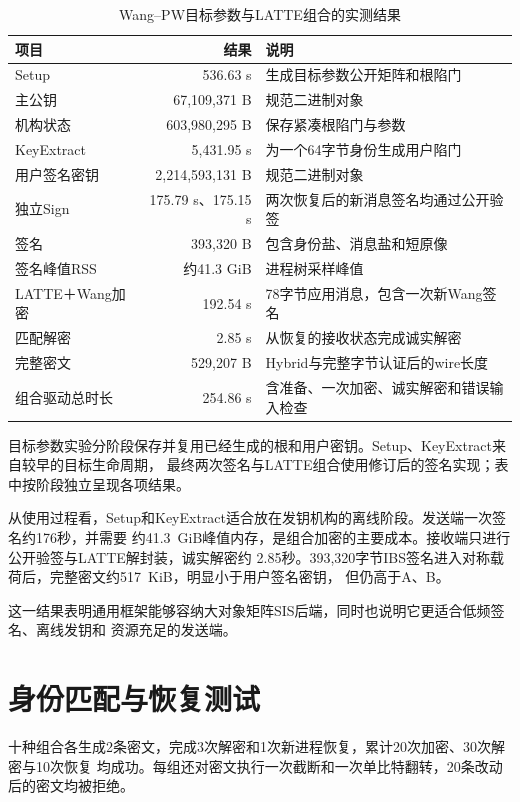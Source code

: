 \begin{table}[H]
\centering\small
\caption{Wang--PW目标参数与LATTE组合的实测结果}
\label{tab:wang-results}
\begin{tabularx}{\textwidth}{@{}p{}rX@{}}
\toprule
\rowcolor{black!8} 项目 & 结果 & 说明 \\
\midrule
Setup & 536.63 s & 生成目标参数公开矩阵和根陷门 \\
主公钥 & 67,109,371 B & 规范二进制对象 \\
机构状态 & 603,980,295 B & 保存紧凑根陷门与参数 \\
KeyExtract & 5,431.95 s & 为一个64字节身份生成用户陷门 \\
用户签名密钥 & 2,214,593,131 B & 规范二进制对象 \\
独立Sign & 175.79 s、175.15 s & 两次恢复后的新消息签名均通过公开验签 \\
签名 & 393,320 B & 包含身份盐、消息盐和短原像 \\
签名峰值RSS & 约41.3 GiB & 进程树采样峰值 \\
LATTE＋Wang加密 & 192.54 s & 78字节应用消息，包含一次新Wang签名 \\
匹配解密 & 2.85 s & 从恢复的接收状态完成诚实解密 \\
完整密文 & 529,207 B & Hybrid与完整字节认证后的wire长度 \\
组合驱动总时长 & 254.86 s & 含准备、一次加密、诚实解密和错误输入检查 \\
\bottomrule
\end{tabularx}
\end{table}

目标参数实验分阶段保存并复用已经生成的根和用户密钥。Setup、KeyExtract来自较早的目标生命周期，
最终两次签名与LATTE组合使用修订后的签名实现；表中按阶段独立呈现各项结果。

从使用过程看，Setup和KeyExtract适合放在发钥机构的离线阶段。发送端一次签名约176秒，并需要
约41.3~GiB峰值内存，是组合加密的主要成本。接收端只进行公开验签与LATTE解封装，诚实解密约
2.85秒。393,320字节IBS签名进入对称载荷后，完整密文约517~KiB，明显小于用户签名密钥，
但仍高于A、B。

这一结果表明通用框架能够容纳大对象矩阵SIS后端，同时也说明它更适合低频签名、离线发钥和
资源充足的发送端。

\section{身份匹配与恢复测试}
十种组合各生成2条密文，完成3次解密和1次新进程恢复，累计20次加密、30次解密与10次恢复
均成功。每组还对密文执行一次截断和一次单比特翻转，20条改动后的密文均被拒绝。

